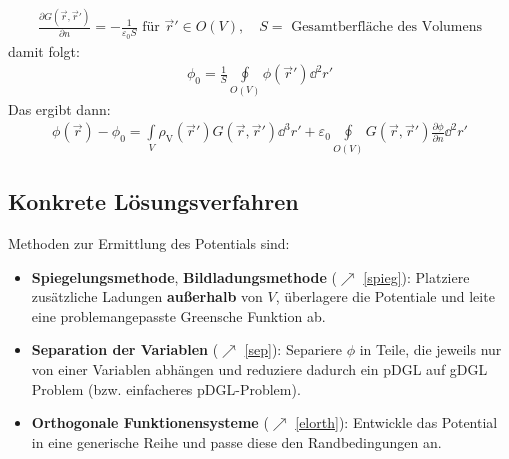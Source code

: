 		        \begin{equation}\begin{split}
				        \frac{\partial G(\vec{r} ,\vec{r}' )}{\partial n} = -\frac{1}{\varepsilon_0 S} \text{ für } \vec{r}'  \in O(V), \quad S = \text{ Gesamtberfläche des Volumens}
			        \end{split}\end{equation}
		    damit folgt:
		        \begin{equation}\begin{split}
				        \phi_0 = \frac{1}{S}\oint\limits_{O(V)} \phi(\vec{r}' ) \dd^2r'
			        \end{split}\end{equation}
		    Das ergibt dann:
		        \begin{equation}\begin{split}
				        \boxed{ \phi(\vec{r} ) -\phi_0 = \int\limits_V
					        \rho_\text{V}(\vec{r}' ) G(\vec{r} ,\vec{r}' ) \dd^3 r' + \varepsilon_0 \oint\limits_{O(V)} G(\vec{r} ,\vec{r}' ) \frac{\partial\phi}{\partial n} \dd^2r'}
			        \end{split}\end{equation}
  \subsection{Konkrete Lösungsverfahren}
		   Methoden zur Ermittlung des Potentials sind:
		   \begin{itemize}
		   \item\textbf{Spiegelungsmethode}, \textbf{Bildladungsmethode} ($\nearrow$ \ref{spieg}): Platziere zusätzliche Ladungen \textbf{außerhalb} von $V$, überlagere die Potentiale und leite eine problemangepasste Greensche Funktion ab.
		  \item\textbf{Separation der Variablen} ($\nearrow$ \ref{sep}): Separiere $\phi$ in Teile, die jeweils nur von einer Variablen abhängen und reduziere dadurch ein pDGL auf gDGL Problem (bzw. einfacheres pDGL-Problem).
		  \item \textbf{Orthogonale Funktionensysteme} ($\nearrow$ \ref{elorth}): Entwickle das Potential in eine generische Reihe und passe diese den Randbedingungen an.
		  \end{itemize}
